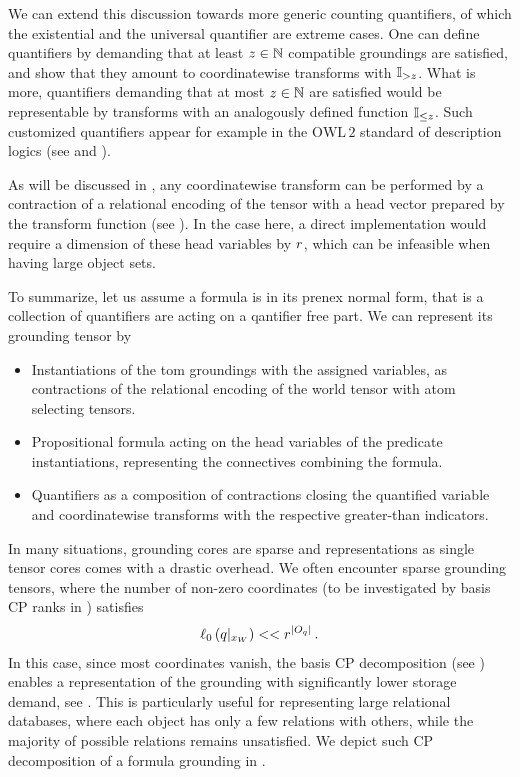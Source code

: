 We can extend this discussion towards more generic counting quantifiers, of which the existential and the universal quantifier are extreme cases.
One can define quantifiers by demanding that at least $z\in\mathbb{N}$ compatible groundings are satisfied, and show that they amount to coordinatewise transforms with $\mathbb{I}_{>z}$.
What is more, quantifiers demanding that at most $z\in\mathbb{N}$ are satisfied would be representable by transforms with an analogously defined function $\mathbb{I}_{\leq z}$.
Such customized quantifiers appear for example in the $\mathrm{OWL\,2}$ standard of description logics (see \cite{rudolph_foundations_2011} and ).

As will be discussed in , any coordinatewise transform can be performed by a contraction of a relational encoding of the tensor with a head vector prepared by the transform function (see ).
In the case here, a direct implementation would require a dimension of these head variables by $r$, which can be infeasible when having large object sets.

To summarize, let us assume a formula is in its prenex normal form, that is a collection of quantifiers are acting on a qantifier free part.
We can represent its grounding tensor by
\begin{itemize}
    \item Instantiations of the tom groundings with the assigned variables, as contractions of the relational encoding of the world tensor with atom selecting tensors.
    \item Propositional formula acting on the head variables of the predicate instantiations, representing the connectives combining the formula.
    \item Quantifiers as a composition of contractions closing the quantified variable and coordinatewise transforms with the respective greater-than indicators.
\end{itemize}



\label{sec:basisCPgrounding}

In many situations, grounding cores are sparse and representations as single tensor cores comes with a drastic overhead.
We often encounter sparse grounding tensors, where the number of non-zero coordinates (to be investigated by basis CP ranks in ) satisfies
\begin{align*}
    \ell_0\left({q}|_{x_{W}}\right) << r^{\left|O_{q}\right|} \, .
\end{align*}
In this case, since most coordinates vanish, the basis CP decomposition (see ) enables a representation of the grounding with significantly lower storage demand, see .
This is particularly useful for representing large relational databases, where each object has only a few relations with others, while the majority of possible relations remains unsatisfied.
We depict such CP decomposition of a formula grounding in .

